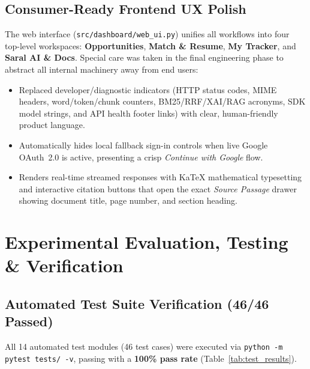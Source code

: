 \documentclass[12pt,a4paper,oneside]{report}
\begin{document}
\section{Consumer-Ready Frontend UX Polish}
The web interface (\texttt{src/dashboard/web\_ui.py}) unifies all workflows into four top-level workspaces: \textbf{Opportunities}, \textbf{Match \& Resume}, \textbf{My Tracker}, and \textbf{Saral AI \& Docs}. Special care was taken in the final engineering phase to abstract all internal machinery away from end users:
\begin{itemize}[itemsep=2pt]
    \item Replaced developer/diagnostic indicators (HTTP status codes, MIME headers, word/token/chunk counters, BM25/RRF/XAI/RAG acronyms, SDK model strings, and API health footer links) with clear, human-friendly product language.
    \item Automatically hides local fallback sign-in controls when live Google OAuth~2.0 is active, presenting a crisp \textit{Continue with Google} flow.
    \item Renders real-time streamed responses with KaTeX mathematical typesetting and interactive citation buttons that open the exact \textit{Source Passage} drawer showing document title, page number, and section heading.
\end{itemize}

\chapter[Evaluation \& Verification]{Experimental Evaluation, Testing \& Verification}

\section{Automated Test Suite Verification (46/46 Passed)}
All 14 automated test modules (46 test cases) were executed via \texttt{python -m pytest tests/ -v}, passing with a \textbf{100\% pass rate} (Table~\ref{tab:test_results}).
\end{document}
